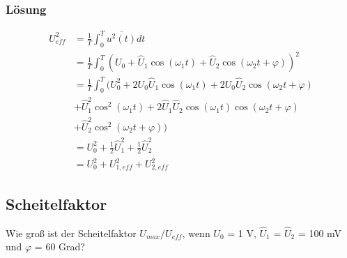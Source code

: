 \documentclass[
  ngerman,
  letterpaper,
]{scrbook}
\begin{document}
\subsubsection{Lösung}\label{luxf6sung-3}

\begin{align}
U^2_{eff} &= \frac{1}{T} \int_0^{T} \overline{u^2(t)} dt \\
&= \frac{1}{T} \int_0^{T} ( U_0 + \hat{U}_1 \cos(\omega_1 t) + \hat{U}_2 \cos(\omega_2 t + \varphi) )^2 \\
&= \frac{1}{T} \int_0^{T} (  U^2_0 + 2U_0\hat{U}_1\cos(\omega_1t) + 2U_0\hat{U}_2\cos(\omega_2 t + \varphi) \\
&+ \hat{U}^2_1\cos^2(\omega_1 t) + 2\hat{U}_1\hat{U}_2\cos(\omega_1 t) \cos(\omega_2 t + \varphi) \\
&+ \hat{U}^2_2 \cos^2(\omega_2 t + \varphi) ) \\  
&= U_0^2 + \frac{1}{2} \hat{U}_1^2 +  \frac{1}{2} \hat{U}_2^2 \\
&= U^2_0 + U^2_{1,eff} + U^2_{2,eff}
\end{align}

\subsection{Scheitelfaktor}\label{scheitelfaktor}

Wie groß ist der Scheitelfaktor \(U_{max}/U_{eff}\), wenn \(U_0\) = 1 V,
\(\hat{U}_1\) = \(\hat{U}_2\) = 100 mV und \(\varphi\) = 60 Grad?
\end{document}
